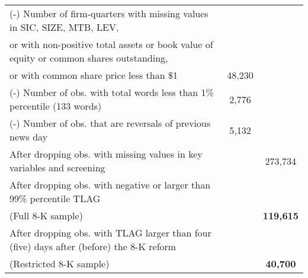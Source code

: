 \begin{table}[htbp]
\begin{tabular}{lcc}
    (-) Number of firm-quarters with missing values in SIC, SIZE, MTB, LEV, & & \\
    \hspace{5mm}or with non-positive total assets or book value of equity or common shares outstanding, & & \\
    \hspace{5mm}or with common share price less than \$1 & 48,230 & \\
    (-) Number of obs. with total words less than 1\% percentile (133 words) & 2,776 & \\
    (-) Number of obs. that are reversals of previous news day & 5,132 & \\
    \bottomrule
    After dropping obs. with missing values in key variables and screening  & & 273,734 \\
    After dropping obs. with negative or larger than 99\% percentile TLAG &  &  \\
    (Full 8-K sample)& & \textbf{119,615} \\
    After dropping obs. with TLAG larger than four (five) days after (before) the 8-K reform &  & \\
    (Restricted 8-K sample) &  & \textbf{40,700} 
    \end{tabular}%
\end{table}%

